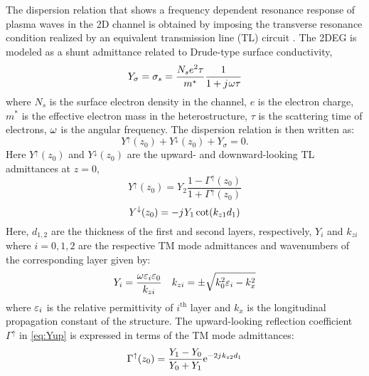 \documentclass[11pt]{article}
\begin{document}
The dispersion relation that shows a frequency dependent resonance response of plasma waves in the 2D channel is obtained by imposing the transverse resonance condition realized by an equivalent transmission line (TL) circuit \cite{Kastner_1988,Michalski2005}. The 2DEG is modeled as a shunt admittance related to Drude-type surface conductivity,
%
\begin{equation}
  Y_{\sigma} = \sigma_s = \frac{N_s e^2 \tau}{m^{\ast}}\frac{1}{1 + j\mkern1mu \omega \tau}
  \label{eq:Y2deg}
\end{equation}
%
where $N_s$ is the surface electron density in the channel, $e$ is the electron charge, $m^{\ast}$ is the effective electron mass in the heterostructure, $\tau$ is the scattering time of electrons, $\omega$ is the angular frequency. The dispersion relation is then written as:
%
\begin{equation}
  Y^{\uparrow}(z_0) + Y^{\downarrow}(z_0) + Y_{\sigma} = 0.
  \label{eq:dispersion}
\end{equation}
%
Here $Y^{\uparrow}(z_0)$ and $Y^{\downarrow}(z_0)$ are the upward- and downward-looking TL admittances at $z = 0$,
%
\begin{equation}
  Y^{\uparrow}(z_0) = Y_2 \frac{1 - \Gamma^{\uparrow}(z_0)}{1 + \Gamma^{\uparrow}(z_0)}
  \label{eq:Yup}
\end{equation}
%
\begin{equation}
  Y^{\downarrow}(z_0) = -j\mkern1mu Y_1 \cot (k_{z1} d_1)
  \label{eq:Ydown}
\end{equation}
%
Here, $d_{1,2}$ are the thickness of the first and second layers,
respectively,  $Y_{i}$ and $k_{zi}$ where $i = 0,1,2$ are the respective TM mode admittances and wavenumbers of the corresponding layer given by:
%
\begin{align}
  & Y_i = \frac{\omega \varepsilon_i \varepsilon_0}{k_{zi}}&&k_{zi} = \pm \sqrt{k_0^2 \varepsilon_i - k_x^2} \\
  \label{eq:Yandk}
\end{align}
%
where $\varepsilon_i$ is the relative permittivity of $i^{\text{th}}$ layer and $k_x$ is the longitudinal propagation constant of the structure. The upward-looking reflection coefficient $\Gamma^{\uparrow}$ in \eqref{eq:Yup} is expressed in terms of the TM mode admittances:
%
\begin{equation}
  \Gamma^{\uparrow}(z_0) = \frac{Y_1 - Y_0}{Y_0 + Y_1} \mathrm{e}^{-2j\mkern1mu k_{z2}d_1}
  \label{eq:Gamma}
\end{equation}
%
\end{document}

